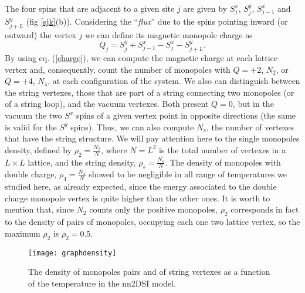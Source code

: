 \documentclass[aps,showkeys,groupedaddress]{revtex4}
\begin{document}
The four spins that are adjacent to a given site $j$ are given by $S^x_j$, $S^y_j$, $S^x_{j-1}$ and $S^y_{j+L}$ (fig \ref{sjk}(b)). Considering the ``{\it flux}'' due to the spins pointing inward (or outward) the vertex $j$ we can define its magnetic monopole charge \cite{Castelnovo2008} as
\begin{equation}
Q_{j} = S^y_{j} + S^x_{j-1} - S^x_{j} - S^y_{j+L}. \label{charge}
\end{equation}
By using eq. (\ref{charge}), we can compute the magnetic charge at each lattice vertex and, consequently, count the number of monopoles with $Q=+2$, $N_2$, or $Q=+4$, $N_4$, at each configuration of the system. We also can distinguish between the string vertexes, those that are part of a string connecting two monopoles (or of a string loop), and the vacuum vertexes. Both present $Q=0$, but in the vacuum the two $S^x$ spins of a given vertex point in opposite directions (the same is valid for the $S^y$ spins). Thus, we can also compute $N_s$, the number of vertexes that have the string structure. We will pay attention here to the single monopoles density, defined by $\rho_2 = \frac{N_2}{N}$, where $N=L^2$ is the total number of vertexes in a $L \times L$ lattice, and the string density, $\rho_s = \frac{N_s}{N}$. The density of monopoles with double charge, $\rho_4 = \frac{N_4}{N}$ showed to be negligible in all range of temperatures we studied here, as already expected, since the energy associated to the double charge monopole vertex is quite higher than the other ones. It is worth to mention that, since $N_2$ counts only the positive monopoles, $\rho_2$ corresponds in fact to the density of pairs of monopoles, occupying each one two lattice vertex, so the maximum $\rho_2$ is $\rho_2 = 0.5$. 

\begin{figure}[ht]
\begin{center}
\texttt{[image: graphdensity]}
\end{center}
\caption{The density of monopoles pairs and of string vertexes as a function of the temperature in the nn2DSI model.}
\label{figDensity}
\end{figure}
\end{document}
